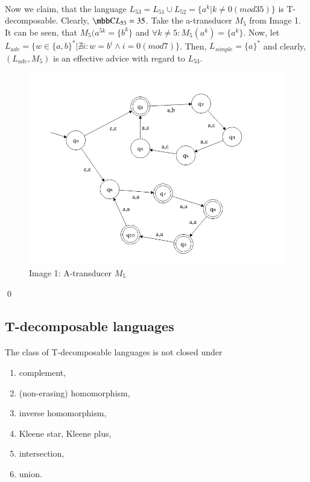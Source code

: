 \begin{enumerate}
\paragraph{}
Now we claim, that the language $L_{53} = L_{51} \cup L_{52} = \{a^k|k\neq 0 (mod 35)\}$ is T-decomposable. Clearly, $\C{L_{53}} = 35$. Take the a-transducer $M_5$ from Image 1. It can be seen, that $M_5(a^{5k} = \{ b^k \}$ and $\forall k \neq 5: M_5(a^k) = \{ a^k \}$. Now, let $L_{adv} = \{ w \in \{a,b\}^* | \nexists i: w = b^i \wedge i = 0 (mod 7) \}$. Then, $L_{simple} = \{a\}^*$ and clearly, $(L_{adv},M_5)$ is an effective advice with regard to $L_{53}$.

\begin{figure}
\includegraphics[scale=0.5]{mainmatter/images/M_5.png}
\caption{Image 1: A-transducer $M_5$}
\end{figure}

\end{enumerate} \qed

\subsection{T-decomposable languages}

\paragraph{}
\cveta The class of T-decomposable languages is not closed under 
\begin{enumerate}
\item complement,
\item (non-erasing) homomorphism,
\item inverse homomorphism,
\item Kleene star, Kleene plus,
\item intersection,
\item union.
\end{enumerate}

